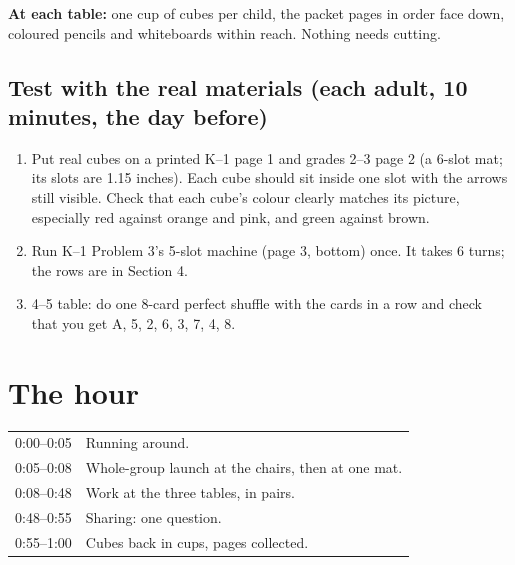 \documentclass[11pt,letterpaper]{extarticle}
\newcommand{\ar}{\ensuremath{\to}}
\begin{document}
\begin{center}
\end{center}

\textbf{At each table:} one cup of cubes per child, the packet pages in order face down, coloured pencils and whiteboards within reach. Nothing needs cutting.

\subsection{Test with the real materials (each adult, 10 minutes, the day before)}
\begin{enumerate}
\item Put real cubes on a printed K--1 page 1 and grades 2--3 page 2 (a 6-slot mat; its slots are 1.15 inches). Each cube should sit inside one slot with the arrows still visible. Check that each cube's colour clearly matches its picture, especially red against orange and pink, and green against brown.
\item Run K--1 Problem 3's 5-slot machine (page 3, bottom) once. It takes 6 turns; the rows are in Section 4.
\item 4--5 table: do one 8-card perfect shuffle with the cards in a row and check that you get A, 5, 2, 6, 3, 7, 4, 8.
\end{enumerate}

\section{The hour}

\begin{tabularx}{\linewidth}{@{}lX@{}}
0:00--0:05 & Running around.\\
0:05--0:08 & Whole-group launch at the chairs, then at one mat.\\
0:08--0:48 & Work at the three tables, in pairs.\\
0:48--0:55 & Sharing: one question.\\
0:55--1:00 & Cubes back in cups, pages collected.\\
\end{tabularx}
\end{document}
